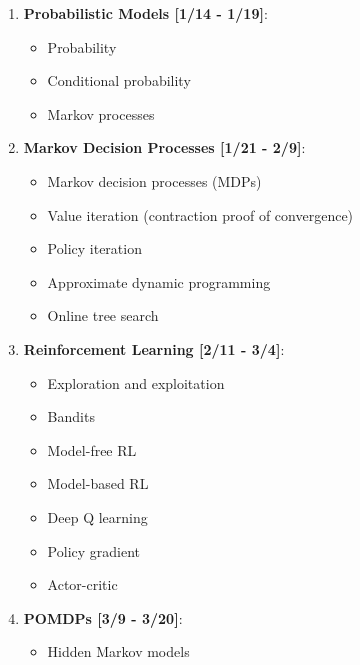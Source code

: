 \documentclass[9pt]{article}
\begin{document}
\begin{enumerate}[noitemsep]
    \item \textbf{Probabilistic Models [1/14 - 1/19]}:
        \begin{multicols}{2}
            \begin{itemize}[noitemsep]
                \item Probability
                \item Conditional probability
                \item Markov processes
            \end{itemize}
        \end{multicols}
    \item \textbf{Markov Decision Processes [1/21 - 2/9]}:
        \begin{multicols}{2}
        \begin{itemize}[noitemsep]
            \item Markov decision processes (MDPs)
            \item Value iteration (contraction proof of convergence)
            \item Policy iteration
            \item Approximate dynamic programming
            \item Online tree search
        \end{itemize}
        \end{multicols}
    \item \textbf{Reinforcement Learning [2/11 - 3/4]}:
        \begin{multicols}{2}
        \begin{itemize}[noitemsep]
            \item Exploration and exploitation
            \item Bandits
            \item Model-free RL
            \item Model-based RL
            \item Deep Q learning
            \item Policy gradient
            \item Actor-critic
        \end{itemize}
        \end{multicols}
    \item \textbf{POMDPs [3/9 - 3/20]}:
        \begin{multicols}{2}
        \begin{itemize}[noitemsep]
            \item Hidden Markov models

\end{itemize}
\end{multicols}
\end{enumerate}
\end{document}
